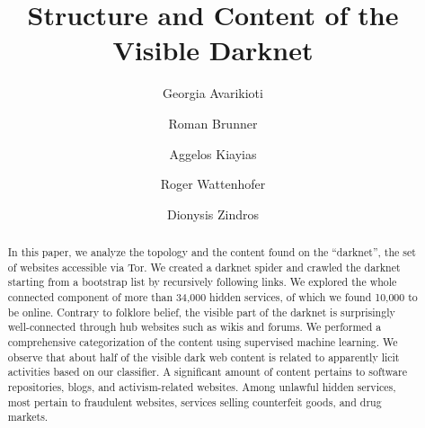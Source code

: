 \documentclass[USenglish,oneside,twocolumn]{article}
\begin{document}
      \author[1]{Georgia Avarikioti}
   
      \author[2]{Roman Brunner}
    
      \author[3]{Aggelos Kiayias}
   
      \author[4]{Roger Wattenhofer}
   
      \author[5]{Dionysis Zindros}
  
      
      
      
      

\title{\huge Structure and Content of the Visible Darknet}



  \begin{abstract}
{In this paper, we analyze the topology and the content found on the ``darknet'', the set of websites accessible via Tor. We created a darknet spider and crawled the darknet starting from a bootstrap list by recursively following links. We explored the whole connected component of more than 34,000 hidden services, of which we found 10,000 to be online. Contrary to folklore belief, the visible part of the darknet is surprisingly well-connected through hub websites such as wikis and forums. We performed a comprehensive categorization of the content using supervised machine learning. We observe that about half of the visible dark web content is related to apparently licit activities based on our classifier. A significant amount of content pertains to software repositories, blogs, and activism-related websites. Among unlawful hidden services, most pertain to fraudulent websites, services selling counterfeit goods, and drug markets.
}
\end{abstract}

\end{document}
